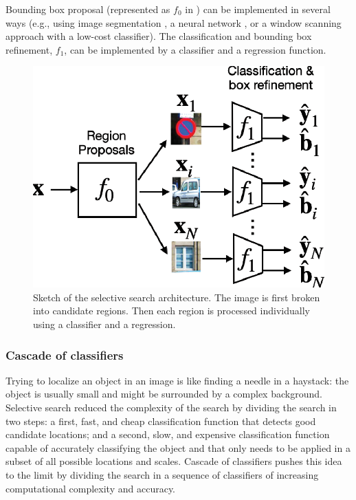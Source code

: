 Bounding box proposal (represented as $f_0$ in \fig{\ref{fig:selective_search_architecture}}) can be implemented in several ways (e.g., using image segmentation \cite{Uijlings2013}, a neural network \cite{Ren2015}, or a window scanning approach with a low-cost classifier). The classification and bounding box refinement, $f_1$, can be implemented by a classifier and a regression function.
\begin{figure}
\centerline{
\includegraphics[width=.4\linewidth]{figures/object_recognition/selective_search_architecture.eps}
}
\caption{Sketch of the selective search architecture. The image is first broken into candidate regions. Then each region is processed individually using a classifier and a regression.}
\label{fig:selective_search_architecture}
\end{figure}




\subsubsection{Cascade of classifiers}
Trying to localize an object in an image is like finding a needle in a haystack: the object is usually small and might be surrounded by a complex background. 
Selective search reduced the complexity of the search by dividing the search in two steps: a first, fast, and cheap classification function that detects good candidate locations; and a second, slow, and expensive classification function capable of accurately classifying the object and that only needs to be applied in a subset of all possible locations and scales. Cascade of classifiers pushes this idea to the limit by dividing the search in a sequence of classifiers of increasing computational complexity and accuracy. 


